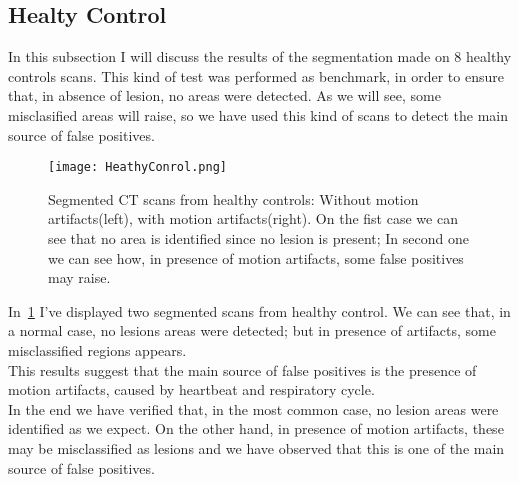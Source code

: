 
	\subsection{Healty Control}
	
	In this subsection I will discuss the results of the segmentation made on $8$ healthy controls scans. This kind of  test was performed as benchmark, in order to ensure that, in absence of lesion, no areas were detected. As we will see, some misclasified areas will raise, so we have used this kind of scans to detect the main source of false positives.
	
	
	\begin{figure}[h!]
		\centering
			\texttt{[image: HeathyConrol.png]}
			\caption{Segmented CT scans from healthy controls: Without motion artifacts(left), with motion artifacts(right). On the fist case we can see that no area is identified since no lesion is present; In second one we can see how, in presence of motion artifacts, some false positives may raise.  }\label{fig:HealthyControl}
	\end{figure}

	In \figurename\,\ref{fig:HealthyControl} I've displayed two segmented scans from healthy control. We can see that, in a normal case, no lesions areas were detected; but in presence of artifacts, some misclassified regions appears.\\
	This results suggest that the main source of false positives is the presence of motion artifacts, caused by heartbeat and respiratory cycle.\\
	
	In the end we have verified that, in the most common case, no lesion areas were identified as we expect. On the other hand, in presence of motion artifacts, these may be misclassified as lesions and we have observed that this is one of the main source of false positives. 
	
	
	


